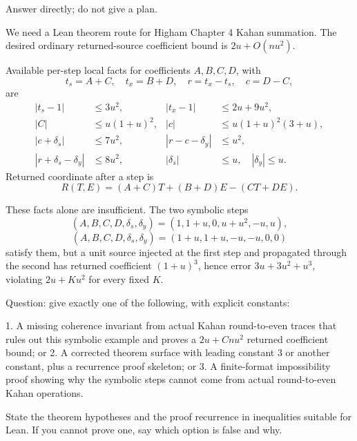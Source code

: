 \documentclass{article}
\begin{document}
Answer directly; do not give a plan.

We need a Lean theorem route for Higham Chapter 4 Kahan summation.  The desired
ordinary returned-source coefficient bound is \(2u+O(nu^2)\).

Available per-step local facts for coefficients \(A,B,C,D\), with
\[
t_s=A+C,\quad t_x=B+D,\quad r=t_x-t_s,\quad c=D-C,
\]
are
\[
\begin{aligned}
|t_s-1|&\le3u^2,& |t_x-1|&\le2u+9u^2,\\
|C|&\le u(1+u)^2,& |c|&\le u(1+u)^2(3+u),\\
|c+\delta_s|&\le7u^2,& |r-c-\delta_y|&\le u^2,\\
|r+\delta_s-\delta_y|&\le8u^2,& |\delta_s|&\le u,\quad |\delta_y|\le u.
\end{aligned}
\]
Returned coordinate after a step is
\[
R(T,E)=(A+C)T+(B+D)E-(CT+DE).
\]

These facts alone are insufficient.  The two symbolic steps
\[
(A,B,C,D,\delta_s,\delta_y)=(1,1+u,0,u+u^2,-u,u),
\]
\[
(A,B,C,D,\delta_s,\delta_y)=(1+u,1+u,-u,-u,0,0)
\]
satisfy them, but a unit source injected at the first step and propagated
through the second has returned coefficient \((1+u)^3\), hence error
\(3u+3u^2+u^3\), violating \(2u+Ku^2\) for every fixed \(K\).

Question: give exactly one of the following, with explicit constants:

1. A missing coherence invariant from actual Kahan round-to-even traces that
rules out this symbolic example and proves a \(2u+Cnu^2\) returned coefficient
bound; or
2. A corrected theorem surface with leading constant \(3\) or another constant,
plus a recurrence proof skeleton; or
3. A finite-format impossibility proof showing why the symbolic steps cannot
come from actual round-to-even Kahan operations.

State the theorem hypotheses and the proof recurrence in inequalities suitable
for Lean.  If you cannot prove one, say which option is false and why.
\end{document}
